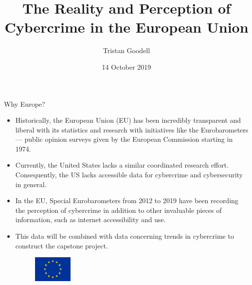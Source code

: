\documentclass[aspectratio=32]{beamer}
\title{The Reality and Perception of Cybercrime in the European Union}
\author{Tristan Goodell}
\institute[]{Arkansas School for Mathematics, Sciences, and the Arts}
\date{14 October 2019}
\begin{document}
{
\begin{frame}{}

\end{frame}
}

\begin{frame}{Why Europe?}

\begin{itemize}
    \item Historically, the European Union (EU) has been incredibly transparent and liberal with its statistics and research with initiatives like the Eurobarometers--- public opinion surveys given by the European Commission starting in 1974. 
    \item Currently, the United States lacks a similar coordinated research effort. Consequently, the US lacks accessible data for cybercrime and cybersecurity in general.
    \item In the EU, Special Eurobarometers from 2012 to 2019 have been recording the perception of cybercrime in addition to other invaluable pieces of information, such as internet accessibility and use.
    \item This data will be combined with data concerning trends in cybercrime to construct the capstone project.
    \begin{figure}
        \includegraphics[width=55pt]{eu.png}
    \end{figure}
\end{itemize}

\end{frame}
\end{document}

